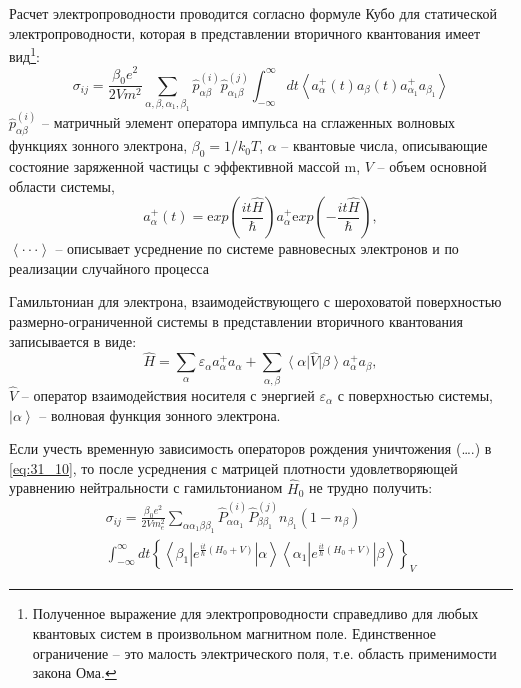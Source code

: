 Расчет электропроводности проводится согласно формуле Кубо \cite{Kubo1957a} для статической электропроводности, которая в представлении вторичного квантования имеет вид\footnote{ Полученное выражение для электропроводности справедливо для любых квантовых систем в произвольном магнитном поле. Единственное ограничение -- это малость электрического поля, т.е. область применимости закона Ома.}:
\begin{equation} \label{eq:31_10}
\sigma _{ij} =\frac{\beta _{0} e^{2} }{2Vm^{2} } \sum _{\alpha ,\beta ,\alpha _{1} ,\beta _{1} }\hat{p}_{\alpha \beta }^{(i)} \hat{p}_{\alpha _{1} \beta }^{(j)} \int _{-\infty }^{\infty }dt\left\langle a_{\alpha }^{+} (t)a_{\beta } (t)a_{\alpha _{1} }^{+} a_{\beta _{1} } \right\rangle
\end{equation} 
$\hat{p}_{\alpha \beta }^{(i)} $ -- матричный элемент оператора импульса на сглаженных волновых функциях зонного электрона, $\beta _{0} =1/k_{0} T$, $\alpha $ -- квантовые числа, описывающие состояние заряженной частицы с эффективной массой m, $V$ -- объем основной области системы,
\[
a_{\alpha }^{+} (t)={\mathrm exp}\left(\frac{it\hat{H}}{\hbar } \right)a_{\alpha }^{+} {\mathrm exp}\left(-\frac{it\hat{H}}{\hbar } \right),
\] 
$\left\langle \cdot \cdot \cdot \right\rangle $ -- описывает усреднение по системе равновесных электронов и по реализации случайного процесса

Гамильтониан для электрона, взаимодействующего с шероховатой поверхностью размерно-ограниченной системы в представлении вторичного квантования записывается в виде:
\begin{equation} \label{eq:31_20}
\hat{H}=\sum _{\alpha }\varepsilon _{\alpha } a_{\alpha }^{+} a_{\alpha } +\sum _{\alpha ,\beta }{\left\langle \alpha  \right|} \hat{V}{\left| \beta  \right\rangle} a_{\alpha }^{+} a_{\beta }, 
\end{equation}
$\hat{V}$ -- оператор взаимодействия носителя с энергией $\varepsilon _{\alpha } $ с поверхностью системы, ${\left| \alpha  \right\rangle} $ -- волновая функция зонного электрона.

Если учесть временную зависимость операторов рождения уничтожения (\dots .) в \eqref{eq:31_10}, то после усреднения с матрицей плотности удовлетворяющей уравнению нейтральности с гамильтонианом ${\hat{H}}_0$ не трудно получить:
\begin{multline} \label{eq:31_30}
{\sigma }_{ij}=\frac{{\beta }_0 e^2}{2Vm^2_e}\sum_{\alpha \alpha _1\beta \beta_1}{{\hat{P}}^{\left(i\right)}_{\alpha {\alpha }_1}{\hat{P}}^{\left(j\right)}_{\beta {\beta }_1}n_{{\beta }_1}\left(1-n_{\beta }\right)}\\
\int^{\infty }_{-\infty }{d t {\left\{\left\langle {\beta }_1\left|e^{\frac{it}{\hbar }\left(H_0+V\right)}\right|\alpha \right\rangle \left\langle {\alpha }_1\left|e^{\frac{i t}{\hbar }\left(H_0+V\right)}\right|\beta \right\rangle \right\}}_V}
\end{multline}

